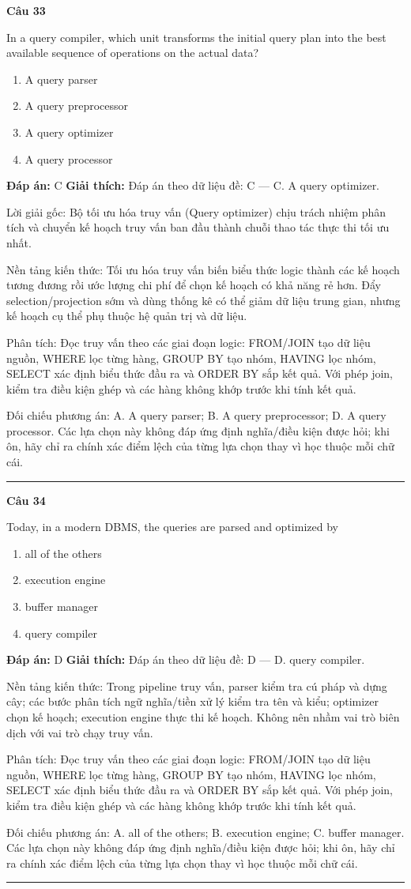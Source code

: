 \documentclass[11pt,a4paper]{article}
\newenvironment{question}[1]{%
  \par\vspace{1em}\noindent\textbf{\large Câu #1}\par\vspace{0.4em}
}{%
  \par\vspace{1em}\hrule\vspace{0.6em}
}
\newenvironment{choices}{%
  \begin{enumerate}[label=\textbf{\Alph*.},leftmargin=2.2em,itemsep=2pt,topsep=3pt]
}{%
  \end{enumerate}
}
\newcommand{\choice}{\item}
\begin{document}
\begin{question}{33}
In a query compiler, which unit transforms the initial query plan into the best available sequence of operations on the actual data?
\begin{choices}
\choice A query parser
\choice A query preprocessor
\choice A query optimizer
\choice A query processor
\end{choices}
\textbf{Đáp án:} C
\textbf{Giải thích:} Đáp án theo dữ liệu đề: C — C. A query optimizer.

Lời giải gốc: Bộ tối ưu hóa truy vấn (Query optimizer) chịu trách nhiệm phân tích và chuyển kế hoạch truy vấn ban đầu thành chuỗi thao tác thực thi tối ưu nhất.

Nền tảng kiến thức: Tối ưu hóa truy vấn biến biểu thức logic thành các kế hoạch tương đương rồi ước lượng chi phí để chọn kế hoạch có khả năng rẻ hơn. Đẩy selection/projection sớm và dùng thống kê có thể giảm dữ liệu trung gian, nhưng kế hoạch cụ thể phụ thuộc hệ quản trị và dữ liệu.

Phân tích: Đọc truy vấn theo các giai đoạn logic: FROM/JOIN tạo dữ liệu nguồn, WHERE lọc từng hàng, GROUP BY tạo nhóm, HAVING lọc nhóm, SELECT xác định biểu thức đầu ra và ORDER BY sắp kết quả. Với phép join, kiểm tra điều kiện ghép và các hàng không khớp trước khi tính kết quả.

Đối chiếu phương án: A. A query parser; B. A query preprocessor; D. A query processor. Các lựa chọn này không đáp ứng định nghĩa/điều kiện được hỏi; khi ôn, hãy chỉ ra chính xác điểm lệch của từng lựa chọn thay vì học thuộc mỗi chữ cái.
\end{question}

\begin{question}{34}
Today, in a modern DBMS, the queries are parsed and optimized by
\begin{choices}
\choice all of the others
\choice execution engine
\choice buffer manager
\choice query compiler
\end{choices}
\textbf{Đáp án:} D
\textbf{Giải thích:} Đáp án theo dữ liệu đề: D — D. query compiler.

Nền tảng kiến thức: Trong pipeline truy vấn, parser kiểm tra cú pháp và dựng cây; các bước phân tích ngữ nghĩa/tiền xử lý kiểm tra tên và kiểu; optimizer chọn kế hoạch; execution engine thực thi kế hoạch. Không nên nhầm vai trò biên dịch với vai trò chạy truy vấn.

Phân tích: Đọc truy vấn theo các giai đoạn logic: FROM/JOIN tạo dữ liệu nguồn, WHERE lọc từng hàng, GROUP BY tạo nhóm, HAVING lọc nhóm, SELECT xác định biểu thức đầu ra và ORDER BY sắp kết quả. Với phép join, kiểm tra điều kiện ghép và các hàng không khớp trước khi tính kết quả.

Đối chiếu phương án: A. all of the others; B. execution engine; C. buffer manager. Các lựa chọn này không đáp ứng định nghĩa/điều kiện được hỏi; khi ôn, hãy chỉ ra chính xác điểm lệch của từng lựa chọn thay vì học thuộc mỗi chữ cái.
\end{question}
\end{document}
